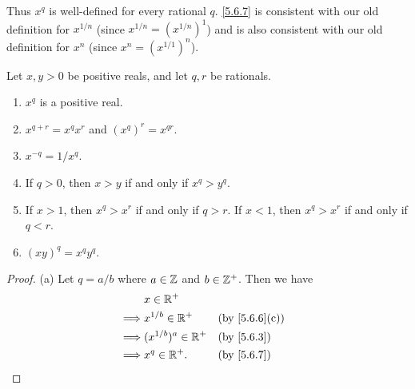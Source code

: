 \begin{note}
  Thus \(x^q\) is well-defined for every rational \(q\).
  \cref{5.6.7} is consistent with our old definition for \(x^{1 / n}\) (since \(x^{1 / n} = (x^{1 / n})^1\)) and is also consistent with our old definition for \(x^n\) (since \(x^n = (x^{1 / 1})^n\)).
\end{note}

\begin{lem}\label{5.6.9}
  Let \(x, y > 0\) be positive reals, and let \(q, r\) be rationals.
  \begin{enumerate}
    \item \(x^q\) is a positive real.
    \item \(x^{q + r} = x^q x^r\) and \((x^q)^r = x^{qr}\).
    \item \(x^{-q} = 1 / x^q\).
    \item If \(q > 0\), then \(x > y\) if and only if \(x^q > y^q\).
    \item If \(x > 1\), then \(x^q > x^r\) if and only if \(q > r\).
          If \(x < 1\), then \(x^q > x^r\) if and only if \(q < r\).
    \item \((xy)^q = x^q y^q\).
  \end{enumerate}
\end{lem}

\begin{proof}{(a)}
  Let \(q = a / b\) where \(a \in \mathbb{Z}\) and \(b \in \mathbb{Z}^+\).
  Then we have
  \begin{align*}
             & x \in \R^+                                              \\
    \implies & x^{1 / b} \in \R^+     &  & \text{(by \cref{5.6.6}(c))} \\
    \implies & (x^{1 / b})^a \in \R^+ &  & \by{5.6.3}                  \\
    \implies & x^q \in \R^+.          &  & \by{5.6.7}
  \end{align*}
\end{proof}

